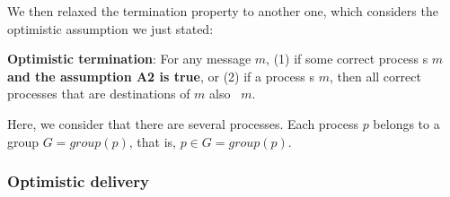 \documentclass[times, 10pt]{article}
\begin{document}
We then relaxed the termination property to another one, which considers the optimistic assumption we just stated:

\textbf{Optimistic termination}: For any message $m$, (1) if some correct process \cms{}s $m$ \textbf{and the assumption A2 is true}, or (2) if a process \cons{}s $m$, then all correct processes that are destinations of $m$ also \cons\ $m$.

Here, we consider that there are several processes. Each process $p$ belongs to a group $G = group(p)$, that is, $p \in G = group(p)$. 

\subsubsection{Optimistic delivery}



\end{document}
